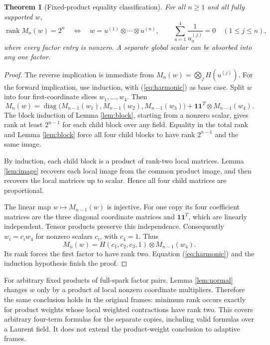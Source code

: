 \documentclass[11pt,letterpaper]{article}
\newtheorem{theorem}{Theorem}[section]
\theoremstyle{definition}\newtheorem{definition}[theorem]{Definition}
\theoremstyle{remark}\newtheorem{remark}[theorem]{Remark}
\DeclareMathOperator{\rank}{rank}
\DeclareMathOperator{\diag}{diag}
\newcommand{\one}{\mathbf 1}
\begin{document}
\begin{theorem}[Fixed-product equality classification]\label{thm:product}
For all $n\geq1$ and all fully supported $w$,
\begin{equation}\label{eq:classification}
\rank M_n(w)=2^n
\quad\Longleftrightarrow\quad
w=u^{(1)}\otimes\cdots\otimes u^{(n)},\qquad
\sum_{a=1}^{4}\frac1{u^{(j)}_a}=0\quad(1\leq j\leq n),
\end{equation}
where every factor entry is nonzero. A separate global scalar can be absorbed into any one factor.
\end{theorem}
\begin{proof}
The reverse implication is immediate from $M_n(w)=\bigotimes_jH(u^{(j)})$. For the forward implication, use induction, with (\ref{eq:harmonic}) as base case. Split $w$ into four first-coordinate slices $w_1,\ldots,w_4$. Then
\[
M_n(w)=\diag\bigl(M_{n-1}(w_1),M_{n-1}(w_2),M_{n-1}(w_3)\bigr)
+\one\one^T\otimes M_{n-1}(w_4).
\]
The block induction of Lemma \ref{lem:block}, starting from a nonzero scalar, gives rank at least $2^{n-1}$ for each child block over any field. Equality in the total rank and Lemma \ref{lem:block} force all four child blocks to have rank $2^{n-1}$ and the same image.

By induction, each child block is a product of rank-two local matrices. Lemma \ref{lem:image} recovers each local image from the common product image, and then recovers the local matrices up to scalar. Hence all four child matrices are proportional.

The linear map $w\mapsto M_{n-1}(w)$ is injective. For one copy its four coefficient matrices are the three diagonal coordinate matrices and $\one\one^T$, which are linearly independent. Tensor products preserve this independence. Consequently $w_i=c_iw_4$ for nonzero scalars $c_i$, with $c_4=1$. Thus
\[
M_n(w)=H(c_1,c_2,c_3,1)\otimes M_{n-1}(w_4).
\]
Its rank forces the first factor to have rank two. Equation (\ref{eq:harmonic}) and the induction hypothesis finish the proof.
\end{proof}

For arbitrary fixed products of full-spark factor pairs, Lemma \ref{lem:normal} changes $w$ only by a product of local nonzero coordinate multipliers. Therefore the same conclusion holds in the original frames: minimum rank occurs exactly for product weights whose local weighted contractions have rank two. This covers arbitrary four-term formulas for the separate copies, including valid formulas over a Laurent field. It does not extend the product-weight conclusion to adaptive frames.
\end{document}
